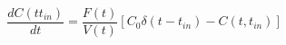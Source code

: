 \begin{equation}
\frac{dC(tt_{in})}{dt} = \frac{F(t)}{V(t)}[C_0\delta(t-t_{in})-C(t,t_{in})]
\end{equation}